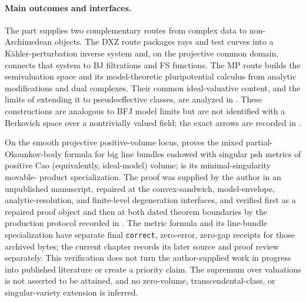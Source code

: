 \paragraph{Main outcomes and interfaces.}
\label{front:part5-main-outcomes-and-interfaces}
The part supplies two complementary routes from complex data to
non-Archimedean objects.  The DXZ route packages rays and test curves into a
K\"ahler-perturbation inverse system and, on the projective common domain,
connects that system to BJ filtrations and FS functions.  The MP route builds
the semivaluation space and its model-theoretic pluripotential calculus from
analytic modifications and dual complexes.  Their common ideal-valuative
content, and the limits of extending it to pseudoeffective classes, are
analyzed in .  These constructions are analogous to
BFJ model limits but are not identified with a Berkovich space over a
nontrivially valued field; the exact arrows are recorded in
.

On the smooth projective positive-volume locus,
 proves the mixed partial-Okounkov-body formula for
big line bundles endowed with singular psh metrics of positive Cao
(equivalently, ideal-model) volume;  is its
minimal-singularity movable-
product specialization.  The proof was supplied by the author in an
unpublished manuscript, repaired at the convex-sandwich, model-envelope,
analytic-resolution, and finite-level degeneration interfaces, and verified
first as a repaired proof object and then at both dated theorem
boundaries by the production protocol recorded in .
The metric formula and its line-bundle specialization have separate final
\texttt{correct}, zero-error, zero-gap receipts for those archived bytes;
the current chapter records its later source and proof review separately.
This verification does not
turn the author-supplied work in progress into published literature or create
a priority claim.  The supremum over valuations is not asserted to be
attained, and no zero-volume, transcendental-class, or singular-variety
extension is inferred.

